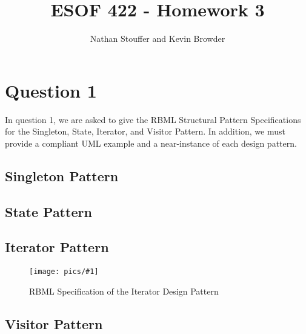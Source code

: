 \documentclass{article}
\newcommand{\fig}[2]{ 
	\begin{figure}[h]
		\centering
		\caption{#2}
		\texttt{[image: pics/\#1]}
		\label{fig:#1}
	\end{figure} 
}
\begin{document}
	
\title{ESOF 422 - Homework 3}
\author{Nathan Stouffer and Kevin Browder}

\maketitle
\newpage

\section*{Question 1}

In question 1, we are asked to give the RBML Structural Pattern Specifications for the Singleton, State, Iterator, and Visitor Pattern. In addition, we must provide a compliant UML example and a near-instance of each design pattern.

\subsection*{Singleton Pattern}



\subsection*{State Pattern}



\subsection*{Iterator Pattern}

\fig{iterator-rbml}{RBML Specification of the Iterator Design Pattern}

\subsection*{Visitor Pattern}
\end{document}
